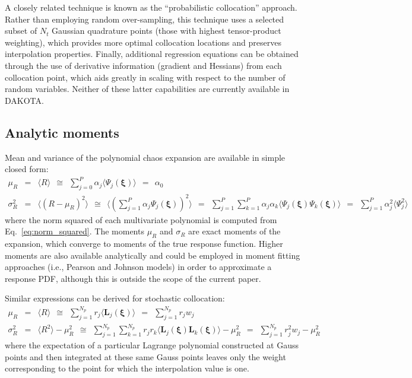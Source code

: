 A closely related technique is known as the ``probabilistic
collocation'' approach.  Rather than employing random over-sampling,
this technique uses a selected subset of $N_t$ Gaussian quadrature
points (those with highest tensor-product weighting), which provides
more optimal collocation locations and preserves interpolation
properties.  Finally, additional regression equations can be obtained
through the use of derivative information (gradient and Hessians) from
each collocation point, which aids greatly in scaling with respect to
the number of random variables.  Neither of these latter capabilities
are currently available in DAKOTA.


\subsection{Analytic moments} \label{uq:expansion:moment}

Mean and variance of the polynomial chaos expansion are available
in simple closed form:
\begin{eqnarray}
\mu_R      &=& \langle R \rangle ~~\cong~~ \sum_{j=0}^P \alpha_j \langle 
\Psi_j(\boldsymbol{\xi}) \rangle ~~=~~ \alpha_0 \label{eq:mean_pce} \\
\sigma^2_R &=& \langle (R - \mu_R)^2 \rangle ~~\cong~~ 
\langle (\sum_{j=1}^P \alpha_j \Psi_j(\boldsymbol{\xi}))^2 \rangle
~~=~~ \sum_{j=1}^P \sum_{k=1}^P \alpha_j \alpha_k
\langle \Psi_j(\boldsymbol{\xi}) \Psi_k(\boldsymbol{\xi}) \rangle
~~=~~ \sum_{j=1}^P \alpha^2_j \langle \Psi^2_j \rangle \label{eq:var_pce} 
\end{eqnarray}
where the norm squared of each multivariate polynomial is computed
from Eq.~\ref{eq:norm_squared}.  The moments $\mu_R$ and $\sigma_R$
are exact moments of the expansion, which converge to moments of the
true response function.  Higher moments are also available
analytically and could be employed in moment fitting approaches (i.e.,
Pearson and Johnson models) in order to approximate a response PDF,
although this is outside the scope of the current paper.

Similar expressions can be derived for stochastic collocation:
\begin{eqnarray}
\mu_R      &=& \langle R \rangle ~~\cong~~ \sum_{j=1}^{N_p} r_j \langle 
\boldsymbol{L}_j(\boldsymbol{\xi}) \rangle ~~=~~ \sum_{j=1}^{N_p} r_j w_j 
\label{eq:mean_sc} \\
\sigma^2_R &=& \langle R^2 \rangle - \mu_R^2
~~\cong~~ \sum_{j=1}^{N_p} \sum_{k=1}^{N_p} r_j r_k \langle
\boldsymbol{L}_j(\boldsymbol{\xi}) \boldsymbol{L}_k(\boldsymbol{\xi}) \rangle
- \mu_R^2  ~~=~~ \sum_{j=1}^{N_p} r^2_j w_j - \mu_R^2 \label{eq:var_sc} 
\end{eqnarray}
where the expectation of a particular Lagrange polynomial constructed 
at Gauss points and then integrated at these same Gauss points leaves
only the weight corresponding to the point for which the interpolation
value is one.


